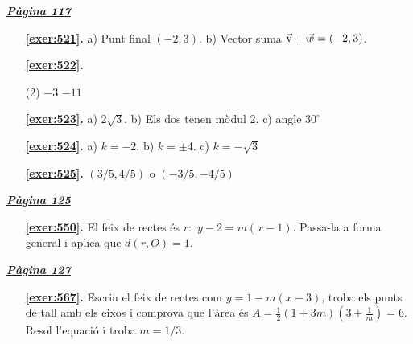 
\hyperlink{page.117}{\textbf{\em Pàgina 117}}
\begin{enumerate}
\item[\fontfamily{phv}\selectfont\color{blue}\textbf{\ref{exer:521}. }] \label{ans:521} 
a) Punt final $(-2, 3)$. b) Vector suma $\vec{\mathrm{v}} +\vec w=(-2, 3)$.
 \end{enumerate}
\begin{enumerate}



 \item[\fontfamily{phv}\selectfont\color{blue}\textbf{\ref{exer:522}. }] \label{ans:522}
 \begin{tasks}[column-sep=1em, item-indent=1.3333em](2)
	 \task $-3$
	 \task $-11$
\end{tasks}
\item[\fontfamily{phv}\selectfont\color{blue}\textbf{\ref{exer:523}. }] \label{ans:523} 
 a) $2\sqrt {3}$. b) Els dos tenen mòdul 2. c) angle $30^\circ $
\item[\fontfamily{phv}\selectfont\color{blue}\textbf{\ref{exer:524}. }] \label{ans:524} 
a) $k=-2$. b) $k=\pm 4$. c) $k=-\sqrt {3}$
\item[\fontfamily{phv}\selectfont\color{blue}\textbf{\ref{exer:525}. }] \label{ans:525} 
$(3/5, 4/5)$ o $(-3/5, -4/5)$
 \end{enumerate}

 \vspace{1cm} 
 

\vspace{0.3cm}


\hyperlink{page.125}{\textbf{\em Pàgina 125}}
\begin{enumerate}
\item[\fontfamily{phv}\selectfont\color{blue}\textbf{\ref{exer:550}. }] \label{ans:550} 
El feix de rectes és $r:$ $y-2=m(x-1)$. Passa-la a forma general i aplica que $d(r,O)=1$.
 \end{enumerate}
\vspace{0.3cm}


\hyperlink{page.127}{\textbf{\em Pàgina 127}}
\begin{enumerate}
\item[\fontfamily{phv}\selectfont\color{blue}\textbf{\ref{exer:567}. }] \label{ans:567} 
Escriu el feix de rectes com $y=1-m(x-3)$, troba els punts de tall amb els eixos i comprova que l'àrea és $A=\frac {1}{2}(1+3m)(3+\frac {1}{m})=6$. Resol l'equació i troba $m=1/3$.
 \end{enumerate}
\vspace{0.3cm}


